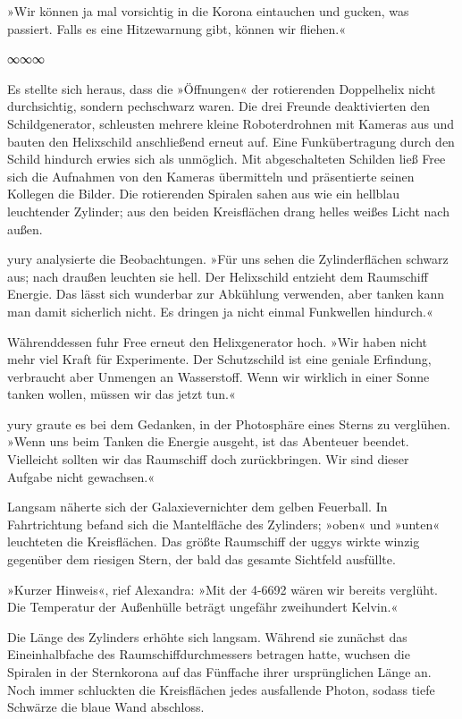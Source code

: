 »Wir können ja mal vorsichtig in die Korona eintauchen und gucken, was passiert. Falls es eine Hitzewarnung gibt, können wir fliehen.«

\begin{center}
∞∞∞
\end{center}

Es stellte sich heraus, dass die »Öffnungen« der rotierenden Doppelhelix nicht durchsichtig, sondern pechschwarz waren. Die drei Freunde deaktivierten den Schildgenerator, schleusten mehrere kleine Roboterdrohnen mit Kameras aus und bauten den Helixschild anschließend erneut auf. Eine Funkübertragung durch den Schild hindurch erwies sich als unmöglich. Mit abgeschalteten Schilden ließ Free sich die Aufnahmen von den Kameras übermitteln und präsentierte seinen Kollegen die Bilder. Die rotierenden Spiralen sahen aus wie ein hellblau leuchtender Zylinder; aus den beiden Kreisflächen drang helles weißes Licht nach außen.

yury analysierte die Beobachtungen. »Für uns sehen die Zylinderflächen schwarz aus; nach draußen leuchten sie hell. Der Helixschild entzieht dem Raumschiff Energie. Das lässt sich wunderbar zur Abkühlung verwenden, aber tanken kann man damit sicherlich nicht. Es dringen ja nicht einmal Funkwellen hindurch.«

Währenddessen fuhr Free erneut den Helixgenerator hoch. »Wir haben nicht mehr viel Kraft für Experimente. Der Schutzschild ist eine geniale Erfindung, verbraucht aber Unmengen an Wasserstoff. Wenn wir wirklich in einer Sonne tanken wollen, müssen wir das jetzt tun.«

yury graute es bei dem Gedanken, in der Photosphäre eines Sterns zu verglühen. »Wenn uns beim Tanken die Energie ausgeht, ist das Abenteuer beendet. Vielleicht sollten wir das Raumschiff doch zurückbringen. Wir sind dieser Aufgabe nicht gewachsen.«

Langsam näherte sich der Galaxievernichter dem gelben Feuerball. In Fahrtrichtung befand sich die Mantelfläche des Zylinders; »oben« und »unten« leuchteten die Kreisflächen. Das größte Raumschiff der uggys wirkte winzig gegenüber dem riesigen Stern, der bald das gesamte Sichtfeld ausfüllte.

»Kurzer Hinweis«, rief Alexandra: »Mit der 4-6692 wären wir bereits verglüht. Die Temperatur der Außenhülle beträgt ungefähr zweihundert Kelvin.«

Die Länge des Zylinders erhöhte sich langsam. Während sie zunächst das Eineinhalbfache des Raumschiffdurchmessers betragen hatte, wuchsen die Spiralen in der Sternkorona auf das Fünffache ihrer ursprünglichen Länge an. Noch immer schluckten die Kreisflächen jedes ausfallende Photon, sodass tiefe Schwärze die blaue Wand abschloss.

